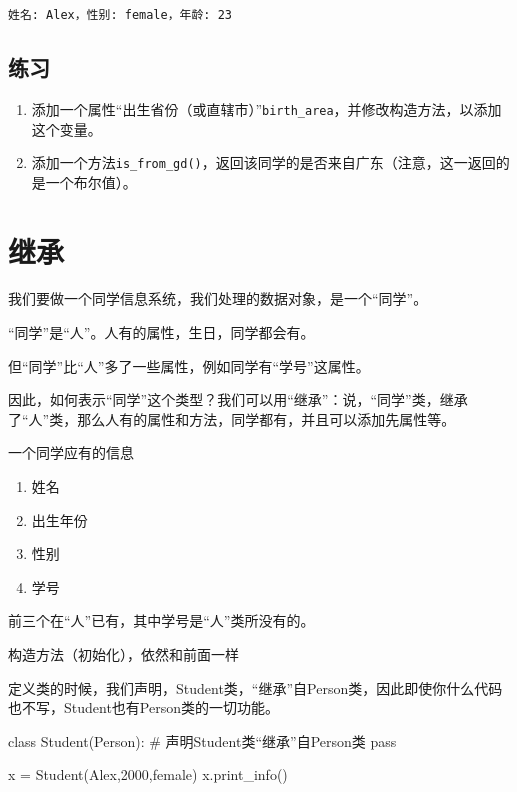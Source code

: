 \documentclass[
  letterpaper,
  DIV=11,
  numbers=noendperiod]{scrreprt}
\newenvironment{Shaded}{\begin{snugshade}}{\end{snugshade}}
\newcommand{\CommentTok}[1]{\textcolor[rgb]{0.37,0.37,0.37}{#1}}
\newcommand{\ControlFlowTok}[1]{\textcolor[rgb]{0.00,0.23,0.31}{#1}}
\newcommand{\DecValTok}[1]{\textcolor[rgb]{0.68,0.00,0.00}{#1}}
\newcommand{\KeywordTok}[1]{\textcolor[rgb]{0.00,0.23,0.31}{#1}}
\newcommand{\NormalTok}[1]{\textcolor[rgb]{0.00,0.23,0.31}{#1}}
\newcommand{\OperatorTok}[1]{\textcolor[rgb]{0.37,0.37,0.37}{#1}}
\newcommand{\StringTok}[1]{\textcolor[rgb]{0.13,0.47,0.30}{#1}}
\providecommand{\tightlist}{%
  \setlength{\itemsep}{0pt}\setlength{\parskip}{0pt}}\usepackage{longtable,booktabs,array}
\begin{document}
\begin{verbatim}
姓名: Alex，性别: female，年龄: 23
\end{verbatim}

\hypertarget{ux7ec3ux4e60-3}{%
\subsection{练习}\label{ux7ec3ux4e60-3}}

\begin{enumerate}
\def\labelenumi{\arabic{enumi}.}
\tightlist
\item
  添加一个属性``出生省份（或直辖市）''\texttt{birth\_area}，并修改构造方法，以添加这个变量。
\item
  添加一个方法\texttt{is\_from\_gd()}，返回该同学的是否来自广东（注意，这一返回的是一个布尔值）。
\end{enumerate}

\hypertarget{ux7ee7ux627f}{%
\section{继承}\label{ux7ee7ux627f}}

我们要做一个同学信息系统，我们处理的数据对象，是一个``同学''。

``同学''是``人''。人有的属性，生日，同学都会有。

但``同学''比``人''多了一些属性，例如同学有``学号''这属性。

因此，如何表示``同学''这个类型？我们可以用``继承''：说，``同学''类，继承了``人''类，那么人有的属性和方法，同学都有，并且可以添加先属性等。

一个同学应有的信息

\begin{enumerate}
\def\labelenumi{\arabic{enumi}.}
\tightlist
\item
  姓名
\item
  出生年份
\item
  性别
\item
  学号
\end{enumerate}

前三个在``人''已有，其中学号是``人''类所没有的。

构造方法（初始化），依然和前面一样

定义类的时候，我们声明，Student类，``继承''自Person类，因此即使你什么代码也不写，Student也有Person类的一切功能。

\begin{Shaded}
\begin{Highlighting}[]
\KeywordTok{class}\NormalTok{ Student(Person):  }\CommentTok{\# 声明Student类“继承”自Person类}
    \ControlFlowTok{pass}

\NormalTok{x }\OperatorTok{=}\NormalTok{ Student(}\StringTok{\textquotesingle{}Alex\textquotesingle{}}\NormalTok{,}\DecValTok{2000}\NormalTok{,}\StringTok{\textquotesingle{}female\textquotesingle{}}\NormalTok{)}
\NormalTok{x.print\_info()}
\end{Highlighting}
\end{Shaded}
\end{document}
